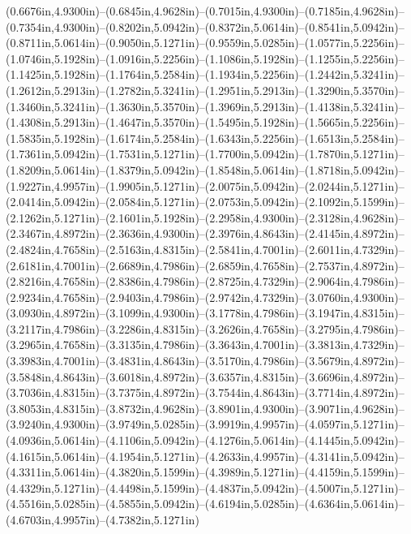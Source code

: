 (0.6676in,4.9300in)--(0.6845in,4.9628in)--(0.7015in,4.9300in)--(0.7185in,4.9628in)--(0.7354in,4.9300in)--(0.8202in,5.0942in)--(0.8372in,5.0614in)--(0.8541in,5.0942in)--(0.8711in,5.0614in)--(0.9050in,5.1271in)--(0.9559in,5.0285in)--(1.0577in,5.2256in)--(1.0746in,5.1928in)--(1.0916in,5.2256in)--(1.1086in,5.1928in)--(1.1255in,5.2256in)--(1.1425in,5.1928in)--(1.1764in,5.2584in)--(1.1934in,5.2256in)--(1.2442in,5.3241in)--(1.2612in,5.2913in)--(1.2782in,5.3241in)--(1.2951in,5.2913in)--(1.3290in,5.3570in)--(1.3460in,5.3241in)--(1.3630in,5.3570in)--(1.3969in,5.2913in)--(1.4138in,5.3241in)--(1.4308in,5.2913in)--(1.4647in,5.3570in)--(1.5495in,5.1928in)--(1.5665in,5.2256in)--(1.5835in,5.1928in)--(1.6174in,5.2584in)--(1.6343in,5.2256in)--(1.6513in,5.2584in)--(1.7361in,5.0942in)--(1.7531in,5.1271in)--(1.7700in,5.0942in)--(1.7870in,5.1271in)--(1.8209in,5.0614in)--(1.8379in,5.0942in)--(1.8548in,5.0614in)--(1.8718in,5.0942in)--(1.9227in,4.9957in)--(1.9905in,5.1271in)--(2.0075in,5.0942in)--(2.0244in,5.1271in)--(2.0414in,5.0942in)--(2.0584in,5.1271in)--(2.0753in,5.0942in)--(2.1092in,5.1599in)--(2.1262in,5.1271in)--(2.1601in,5.1928in)--(2.2958in,4.9300in)--(2.3128in,4.9628in)--(2.3467in,4.8972in)--(2.3636in,4.9300in)--(2.3976in,4.8643in)--(2.4145in,4.8972in)--(2.4824in,4.7658in)--(2.5163in,4.8315in)--(2.5841in,4.7001in)--(2.6011in,4.7329in)--(2.6181in,4.7001in)--(2.6689in,4.7986in)--(2.6859in,4.7658in)--(2.7537in,4.8972in)--(2.8216in,4.7658in)--(2.8386in,4.7986in)--(2.8725in,4.7329in)--(2.9064in,4.7986in)--(2.9234in,4.7658in)--(2.9403in,4.7986in)--(2.9742in,4.7329in)--(3.0760in,4.9300in)--(3.0930in,4.8972in)--(3.1099in,4.9300in)--(3.1778in,4.7986in)--(3.1947in,4.8315in)--(3.2117in,4.7986in)--(3.2286in,4.8315in)--(3.2626in,4.7658in)--(3.2795in,4.7986in)--(3.2965in,4.7658in)--(3.3135in,4.7986in)--(3.3643in,4.7001in)--(3.3813in,4.7329in)--(3.3983in,4.7001in)--(3.4831in,4.8643in)--(3.5170in,4.7986in)--(3.5679in,4.8972in)--(3.5848in,4.8643in)--(3.6018in,4.8972in)--(3.6357in,4.8315in)--(3.6696in,4.8972in)--(3.7036in,4.8315in)--(3.7375in,4.8972in)--(3.7544in,4.8643in)--(3.7714in,4.8972in)--(3.8053in,4.8315in)--(3.8732in,4.9628in)--(3.8901in,4.9300in)--(3.9071in,4.9628in)--(3.9240in,4.9300in)--(3.9749in,5.0285in)--(3.9919in,4.9957in)--(4.0597in,5.1271in)--(4.0936in,5.0614in)--(4.1106in,5.0942in)--(4.1276in,5.0614in)--(4.1445in,5.0942in)--(4.1615in,5.0614in)--(4.1954in,5.1271in)--(4.2633in,4.9957in)--(4.3141in,5.0942in)--(4.3311in,5.0614in)--(4.3820in,5.1599in)--(4.3989in,5.1271in)--(4.4159in,5.1599in)--(4.4329in,5.1271in)--(4.4498in,5.1599in)--(4.4837in,5.0942in)--(4.5007in,5.1271in)--(4.5516in,5.0285in)--(4.5855in,5.0942in)--(4.6194in,5.0285in)--(4.6364in,5.0614in)--(4.6703in,4.9957in)--(4.7382in,5.1271in) 